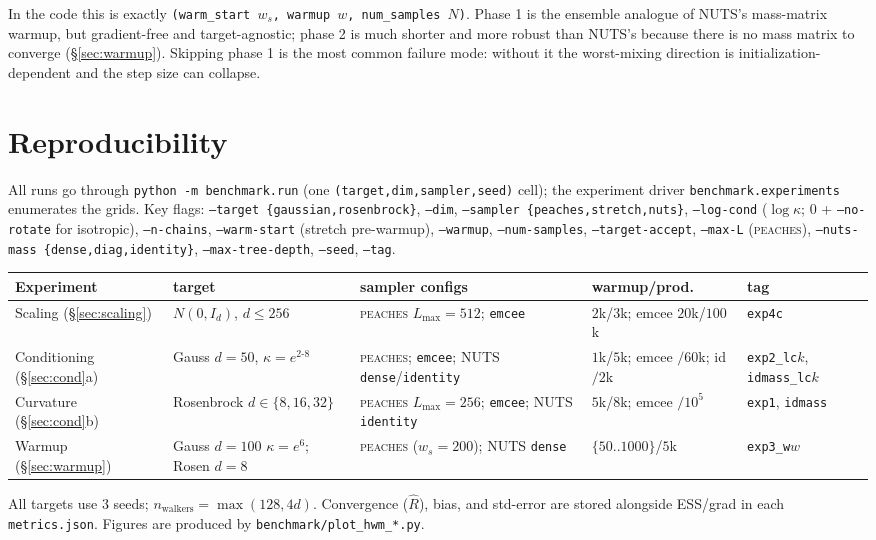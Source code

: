 \documentclass[11pt]{article}
\begin{document}
In the code this is exactly \texttt{(warm\_start $w_s$, warmup $w$,
num\_samples $N$)}. Phase 1 is the ensemble analogue of NUTS's mass-matrix
warmup, but gradient-free and target-agnostic; phase 2 is much shorter and more
robust than NUTS's because there is no mass matrix to converge
(\S\ref{sec:warmup}). Skipping phase 1 is the most common failure mode: without
it the worst-mixing direction is initialization-dependent and the step size can
collapse.

\section{Reproducibility}\label{sec:repro}

All runs go through \texttt{python -m benchmark.run} (one
\texttt{(target,dim,sampler,seed)} cell); the experiment driver
\texttt{benchmark.experiments} enumerates the grids. Key flags:
\texttt{--target \{gaussian,rosenbrock\}}, \texttt{--dim}, \texttt{--sampler
\{peaches,stretch,nuts\}}, \texttt{--log-cond} ($\log\kappa$; $0$ + \texttt{--no-rotate}
for isotropic), \texttt{--n-chains}, \texttt{--warm-start} (stretch pre-warmup),
\texttt{--warmup}, \texttt{--num-samples}, \texttt{--target-accept},
\texttt{--max-L} (\textsc{peaches}), \texttt{--nuts-mass \{dense,diag,identity\}},
\texttt{--max-tree-depth}, \texttt{--seed}, \texttt{--tag}.

\begin{center}\small
\begin{tabular}{lllll}
\toprule
Experiment & target & sampler configs & warmup/prod. & tag \\
\midrule
Scaling (\S\ref{sec:scaling})
  & $N(0,I_d)$, $d\!\le\!256$
  & \textsc{peaches} $L_{\max}{=}512$; \texttt{emcee}
  & $2$k/$3$k; emcee $20$k/$100$k & \texttt{exp4c} \\
Conditioning (\S\ref{sec:cond}a)
  & Gauss $d{=}50$, $\kappa{=}e^{2\text{-}8}$
  & \textsc{peaches}; \texttt{emcee}; NUTS \texttt{dense}/\texttt{identity}
  & $1$k/$5$k; emcee $/60$k; id $/2$k & \texttt{exp2\_lc$k$}, \texttt{idmass\_lc$k$} \\
Curvature (\S\ref{sec:cond}b)
  & Rosenbrock $d{\in}\{8,16,32\}$
  & \textsc{peaches} $L_{\max}{=}256$; \texttt{emcee}; NUTS \texttt{identity}
  & $5$k/$8$k; emcee $/10^5$ & \texttt{exp1}, \texttt{idmass} \\
Warmup (\S\ref{sec:warmup})
  & Gauss $d{=}100$ $\kappa{=}e^6$; Rosen $d{=}8$
  & \textsc{peaches} ($w_s{=}200$); NUTS \texttt{dense}
  & $\{50..1000\}$/$5$k & \texttt{exp3\_w$w$} \\
\bottomrule
\end{tabular}
\end{center}
\noindent
All targets use $3$ seeds; $n_{\text{walkers}}=\max(128,4d)$. Convergence
($\hat R$), bias, and std-error are stored alongside ESS/grad in each
\texttt{metrics.json}. Figures are produced by \texttt{benchmark/plot\_hwm\_*.py}.
\end{document}
